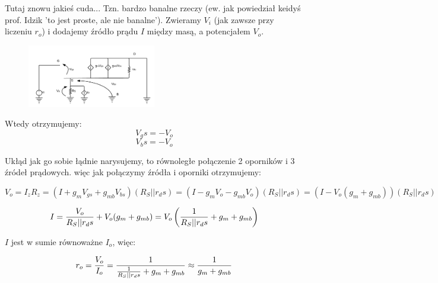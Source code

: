 \documentclass[10pt,a4paper]{article}
\begin{document}
Tutaj znowu jakieś cuda... Tzn. bardzo banalne rzeczy (ew. jak powiedział keidyś prof. Idzik 'to jest proste, ale nie banalne'). Zwieramy $V_i$ (jak zawsze przy liczeniu $r_o$) i dodajemy źródło prądu $I$ między masą, a potencjałem $V_o$.

\begin{figure}[H]
\centering
\includegraphics[width=0.5\textwidth]{CD2}
\end{figure}

Wtedy otrzymujemy:
\begin{equation}
V_gs = - V_o
\end{equation}
\begin{equation}
V_bs = - V_o
\end{equation}

Ukłąd jak go sobie łądnie narysujemy, to równoległe połączenie 2 oporników i 3 źródeł prądowych. więc jak połączymy źródła i oporniki otrzymujemy:

\begin{equation}
V_o = {I_z R_z} = (I + g_mV_{gs} + g_{mb}V_{bs})(R_S || r_ds) = (I - g_mV_o - g_{mb}V_o)(R_S || r_ds) = (I - V_o(g_m + g_{mb}))(R_S || r_ds)
\end{equation}

\begin{equation}
I = {V_o \over R_S || r_ds} + V_o(g_m + g_{mb}) = V_o\left({1 \over R_S || r_ds} + g_m + g_{mb}\right)
\end{equation}

$I$ jest w sumie równoważne $I_o$, więc:

\begin{equation}
r_o = {V_o \over I_o} = {1 \over{1 \over R_S || r_ds} + g_m + g_{mb}} \approx {1 \over g_m + g_{mb}}
\end{equation}
\end{document}
